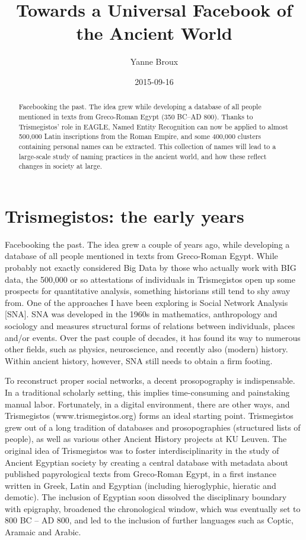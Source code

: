 \documentclass[amsthm,ebook]{saparticle}
\title{Towards a Universal Facebook of the Ancient World}
\author[KU]{Yanne Broux\corref{first}}
\date{2015-09-16}
\begin{document}
\maketitle
\begin{abstract}
Facebooking the past. The idea grew while developing a database of all people mentioned in texts from Greco-Roman Egypt
(350 BC–AD 800). Thanks to Trismegistos' role in EAGLE, Named Entity Recognition can now be applied to almost 500,000
Latin inscriptions from the Roman Empire, and some 400,000 clusters containing personal names can be extracted. This
collection of names will lead to a large-scale study of naming practices in the ancient world, and how these reflect
changes in society at large.
\end{abstract}




\section{Trismegistos: the early years}


Facebooking the past. The idea grew a couple of years ago, while developing a database of all people mentioned in texts
from Greco-Roman Egypt. While probably not exactly considered Big Data by those who actually work with BIG data, the
500,000 or so attestations of individuals in Trismegistos open up some prospects for quantitative analysis, something
historians still tend to shy away from. One of the approaches I have been exploring is Social Network Analysis [SNA].
SNA was developed in the 1960s in mathematics, anthropology and sociology and measures structural forms of relations
between individuals, places and/or events. Over the past couple of decades, it has found its way to numerous other
fields, such as physics, neuroscience, and recently also (modern) history. Within ancient history, however, SNA still
needs to obtain a firm footing.

To reconstruct proper social networks, a decent prosopography is indispensable. In a traditional scholarly setting, this
implies time-consuming and painstaking manual labor. Fortunately, in a digital environment, there are other ways, and
Trismegistos (www.trismegistos.org) forms an ideal starting point. Trismegistos grew out of a long tradition of
databases and prosopographies (structured lists of people), as well as various other Ancient History projects at KU
Leuven. The original idea of Trismegistos was to foster interdisciplinarity in the study of Ancient Egyptian society by
creating a central database with metadata about published papyrological texts from Greco-Roman Egypt, in a first
instance written in Greek, Latin and Egyptian (including hieroglyphic, hieratic and demotic). The inclusion of Egyptian
soon dissolved the disciplinary boundary with epigraphy, broadened the chronological window, which was eventually set
to 800 BC – AD 800, and led to the inclusion of further languages such as Coptic, Aramaic and Arabic.
\end{document}
